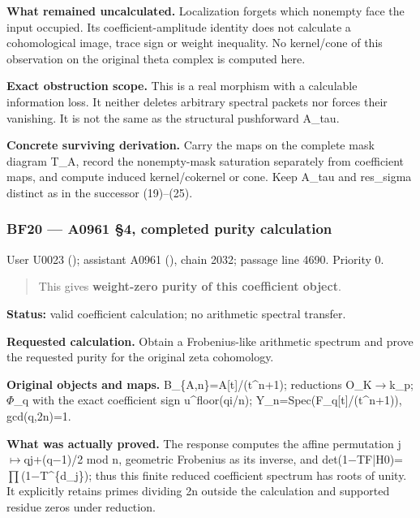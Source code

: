 \textbf{What remained uncalculated.} Localization forgets which nonempty
face the input occupied. Its coefficient-amplitude identity does not
calculate a cohomological image, trace sign or weight inequality. No
kernel/cone of this observation on the original theta complex is
computed here.

\textbf{Exact obstruction scope.} This is a real morphism with a
calculable information loss. It neither deletes arbitrary spectral
packets nor forces their vanishing. It is not the same as the structural
pushforward A\_tau.

\textbf{Concrete surviving derivation.} Carry the maps on the complete
mask diagram T\_A, record the nonempty-mask saturation separately from
coefficient maps, and compute induced kernel/cokernel or cone. Keep
A\_tau and res\_sigma distinct as in the successor (19)--(25).

\subsubsection{BF20 --- A0961 §4, completed purity
calculation}\label{TranscriptLedgerStage:bf20-a0961-4-completed-purity-calculation}

User U0023 (\protect{});
assistant A0961 (\protect{}),
chain 2032; passage line 4690. Priority 0.

\begin{quote}
This gives \textbf{weight-zero purity of this coefficient object}.
\end{quote}

\textbf{Status:} valid coefficient calculation; no arithmetic spectral
transfer.

\textbf{Requested calculation.} Obtain a Frobenius-like arithmetic
spectrum and prove the requested purity for the original zeta
cohomology.

\textbf{Original objects and maps.} B\_\{A,n\}=A{[}t{]}/(t\^{}n+1);
reductions O\_K\allowbreak{}\ensuremath{→}\allowbreak{}k\_p;
\allowbreak{}\ensuremath{Φ}\allowbreak{}\_q with the exact coefficient
sign u\^{}floor(qi/n); Y\_n=Spec(F\_q{[}t{]}/(t\^{}n+1)), gcd(q,2n)=1.

\textbf{What was actually proved.} The response computes the affine
permutation
j\allowbreak{}\ensuremath{↦}\allowbreak{}qj+(q\allowbreak{}\ensuremath{−}\allowbreak{}1)/2
mod n, geometric Frobenius as its inverse, and
det(1\allowbreak{}\ensuremath{−}\allowbreak{}TF|H0)=\allowbreak{}\ensuremath{∏}\allowbreak{}(1\allowbreak{}\ensuremath{−}\allowbreak{}T\textasciicircum{}\{d\_j\});
thus this finite reduced coefficient spectrum has roots of unity. It
explicitly retains primes dividing 2n outside the calculation and
supported residue zeros under reduction.

